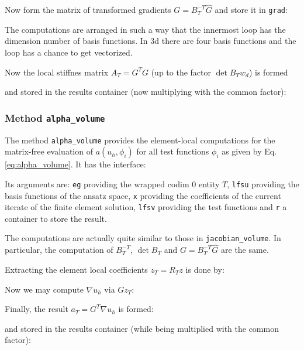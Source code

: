 \documentclass[a4paper,12pt]{article}
\begin{document}
Now form the matrix of transformed gradients $G=B_T^{-T} \hat G$ 
and store it in \lstinline{grad}:

The computations are arranged in such a way that the innermost loop
has the dimension number of basis functions. In 3d there are four basis functions
and the loop has a chance to get vectorized.

Now the local stiffnes matrix $A_T = G^T G$ (up to the factor $\det B_T w_d$) is formed

and stored in the results container (now multiplying with the common factor):


\subsubsection*{Method \lstinline{alpha_volume}}

The method \lstinline{alpha_volume} provides the element-local computations
for the matrix-free evaluation of $a(u_h,\phi_i)$ for all test functions $\phi_i$
as given by Eq.\eqref{eq:alpha_volume}. It has the interface:

Its arguments are: \lstinline{eg} providing the wrapped codim 0 entity $T$,
\lstinline{lfsu} providing the basis functions of the ansatz space,
\lstinline{x} providing the coefficients of the current iterate 
of the finite element solution, \lstinline{lfsv} providing the test functions
and \lstinline{r} a container to store the result.

The computations are actually quite similar to those in \lstinline{jacobian_volume}.
In particular, the computation of $B_T^{-T}$, $\det B_T$ and $G = B_T^{-T} \hat G$
are the same.

Extracting the element local coefficients $z_T = R_T z$ is done by:

Now we may compute $\nabla u_h$ via $G z_T$:

Finally, the result $a_T = G^T \nabla u_h$ is formed:

and stored in the results container (while being multiplied with the common factor):

\end{document}
